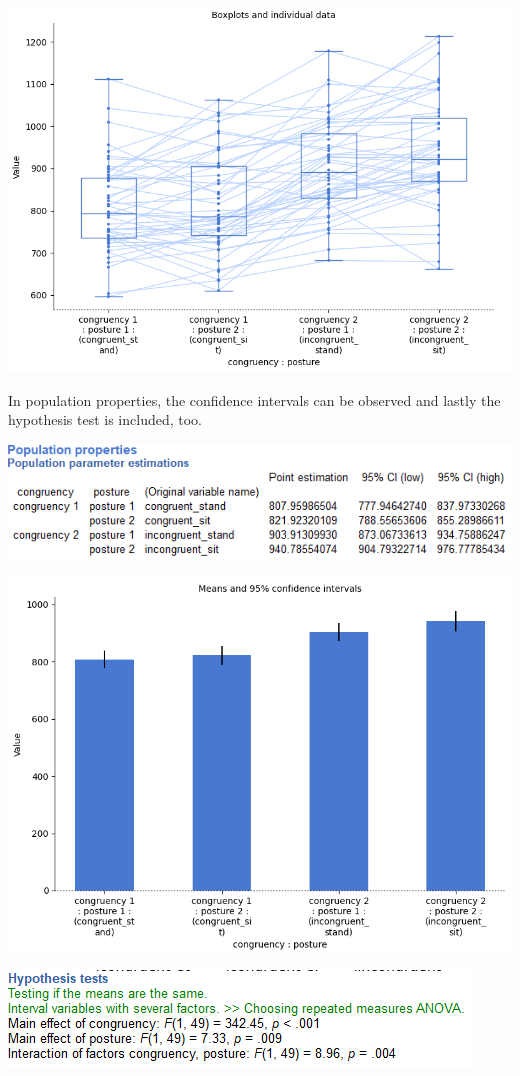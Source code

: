 \documentclass[
]{book}
\begin{document}
\includegraphics{img/ch10/10.5CRMV_boxplot.png}

In population properties, the confidence intervals can be observed and lastly the hypothesis test is included, too.

\includegraphics{img/ch10/10.5CRMV_CI.png}

\includegraphics{img/ch10/10.5CRMV_CI_plot.png}

\includegraphics{img/ch10/10.5CRMV_hyptest.png}
\end{document}
